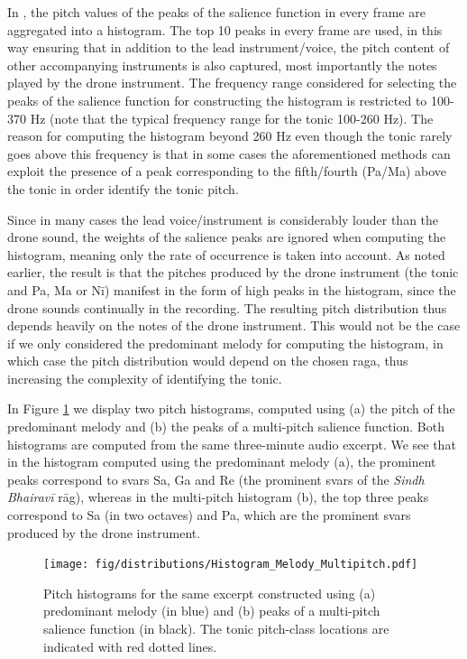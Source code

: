{In \cite{salamon2012multipitch,gulati2012two}, the pitch values of the peaks of the salience function in every frame are aggregated into a histogram. The top 10 peaks in every frame are used, in this way ensuring that in addition to the lead instrument/voice, the pitch content of other accompanying instruments is also captured, most importantly the notes played by the drone instrument. The frequency range considered for selecting the peaks of the salience function for constructing the histogram is restricted to 100-370 Hz (note that the typical frequency range for the tonic 100-260 Hz). The reason for computing the histogram beyond 260 Hz even though the tonic
rarely goes above this frequency is that in some cases the aforementioned methods can exploit the presence of a peak corresponding to the fifth/fourth (Pa/Ma) above the tonic in order identify the tonic pitch.

Since in many cases the lead voice/instrument is considerably louder than the drone sound, the weights of the salience peaks are ignored when computing the histogram, meaning only the rate of occurrence is taken into account. As noted earlier, the result is that the pitches produced by the drone instrument (the tonic and Pa, Ma or Nī) manifest in the form of high peaks in the histogram, since the drone sounds continually in the recording. The resulting pitch distribution thus depends heavily on the notes of the drone instrument. This would not be the case if we only considered the predominant melody for computing the histogram, in which case the pitch distribution would depend on the chosen \gls{raga}, thus increasing the complexity of identifying the tonic.

In Figure \ref{fig:PitchHist} we display two pitch histograms, computed using (a) the pitch of the predominant melody and (b) the peaks of a multi-pitch salience function. Both histograms are computed from the same three-minute audio excerpt. We see that in the histogram computed using the predominant melody (a), the prominent peaks correspond to svars Sa, Ga and Re (the prominent svars of the \textit{Sindh Bhairavī} rāg), whereas in the multi-pitch histogram (b), the top three peaks correspond to Sa (in two octaves) and Pa, which are the prominent svars produced by the drone instrument. 

\begin{figure}
	\centerline{{
			\texttt{[image: fig/distributions/Histogram\_Melody\_Multipitch.pdf]}}}
	\caption[Comparison of the histograms constructed using different
	methods]{Pitch histograms for the same excerpt constructed using (a)
		predominant melody (in blue) and (b) peaks of a multi-pitch salience function (in black). The tonic
		pitch-class locations are indicated with red dotted lines.}
	\label{fig:PitchHist}
\end{figure}

}
